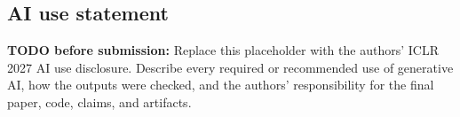 \subsection*{AI use statement}

\textbf{TODO before submission:} Replace this placeholder with the authors'
ICLR 2027 AI use disclosure. Describe every required or recommended use of
generative AI, how the outputs were checked, and the authors' responsibility
for the final paper, code, claims, and artifacts.

